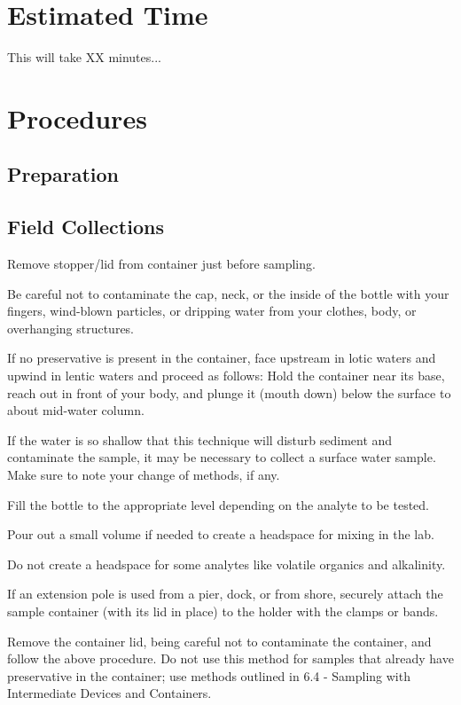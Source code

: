 \documentclass[12pt]{../SOP3_beta}\usepackage[]{graphicx}\usepackage[]{xcolor}
\begin{document}
\section{Estimated Time}

\NP This will take XX minutes...


\section{Procedures}

\subsection{Preparation}




\subsection{Field Collections}

\NP Remove stopper/lid from container just before sampling. 

\NP Be careful not to contaminate the cap, neck, or the inside of the bottle with your fingers, wind-blown particles, or dripping water from your clothes, body, or overhanging structures.  

\NP If no preservative is present in the container, face upstream in lotic waters and upwind in lentic waters and proceed as follows:  Hold the container near its base, reach out in front of your body, and plunge it (mouth down) below the surface to about mid-water column. 

\NP If the water is so shallow that this technique will disturb sediment and contaminate the sample, it may be necessary to collect a surface water sample. Make sure to note your change of methods, if any.  

\NP Fill the bottle to the appropriate level depending on the analyte to be tested.  

\NP Pour out a small volume if needed to create a headspace for mixing in the lab. 

\NP Do not create a headspace for some analytes like volatile organics and alkalinity.  

\NP If an extension pole is used from a pier, dock, or from shore, securely attach the sample container (with its lid in place) to the holder with the clamps or bands. 

\NP Remove the container lid, being careful not to contaminate the container, and follow the above procedure. Do not use this method for samples that already have preservative in the container; use methods outlined in 6.4 - Sampling with Intermediate Devices and Containers.  
\end{document}
